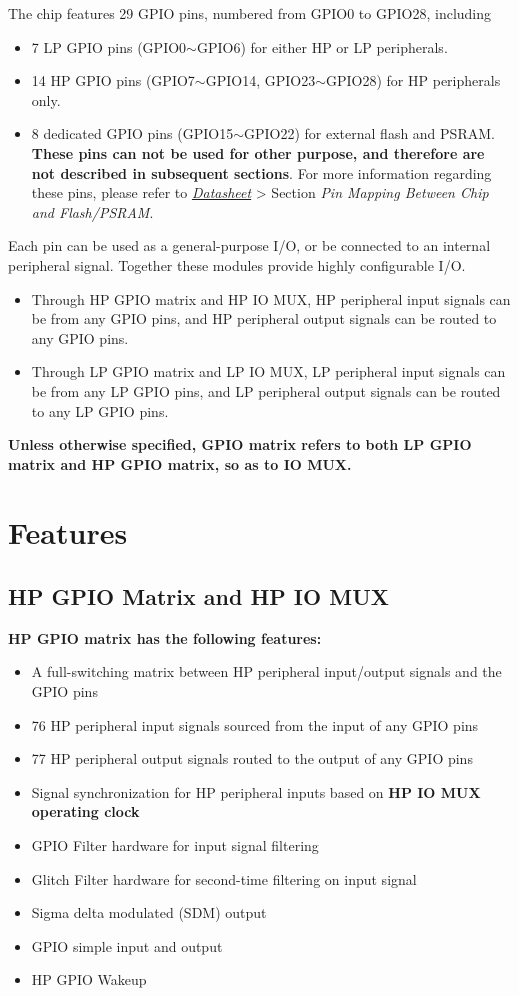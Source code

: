 \documentclass[main\_\_EN.tex]{subfiles}
\begin{document}
The \chipname{} chip features 29 GPIO pins, numbered from GPIO0 to GPIO28, including
\begin{itemize}
    \item 7 LP GPIO pins (GPIO0$\sim$GPIO6) for either HP or LP peripherals.
    \item 14 HP GPIO pins (GPIO7$\sim$GPIO14, GPIO23$\sim$GPIO28) for HP peripherals only.
    \item 8 dedicated GPIO pins (GPIO15$\sim$GPIO22) for external flash and PSRAM. \textbf{These pins can not be used for other purpose, and therefore are not described in subsequent sections}. For more information regarding these pins, please refer to {\textit{\href{https://www.espressif.com/sites/default/files/documentation/esp32-c5_datasheet_en.pdf}{\chipname{} Datasheet}}} > Section \textit{Pin Mapping Between Chip and Flash/PSRAM}.
\end{itemize}
Each pin can be used as a general-purpose I/O, or be connected to an internal peripheral signal. Together these modules provide highly configurable I/O.
\begin{itemize}
\item Through HP GPIO matrix and HP IO MUX, HP peripheral input signals can be from any GPIO pins, and HP peripheral output signals can be routed to any GPIO pins.
\item Through LP GPIO matrix and LP IO MUX, LP peripheral input signals can be from any LP GPIO pins, and LP peripheral output signals can be routed to any LP GPIO pins.
\end{itemize}

\textbf{Unless otherwise specified, GPIO matrix refers to both LP GPIO matrix and HP GPIO matrix, so as to IO MUX.}

\section{Features}
\subsection{HP GPIO Matrix and HP IO MUX}
\textbf{HP GPIO matrix has the following features:}

\begin{itemize}
\item A full-switching matrix between HP peripheral input/output signals and the GPIO pins
\item 76 HP peripheral input signals sourced from the input of any GPIO pins
\item 77 HP peripheral output signals routed to the output of any GPIO pins
\item Signal synchronization for HP peripheral inputs based on \textbf{HP IO MUX operating clock}
\item GPIO Filter hardware for input signal filtering
\item Glitch Filter hardware for second-time filtering on input signal
\item Sigma delta modulated (SDM) output
\item GPIO simple input and output
\item HP GPIO Wakeup
\end{itemize}
\end{document}
